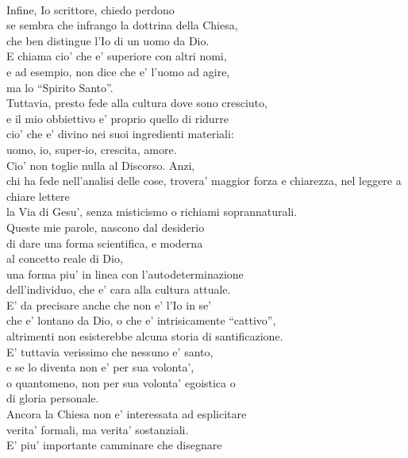 \begin{haiku}
    \leavevmode\\
    Infine, Io scrittore, chiedo perdono \\
    se sembra che infrango la dottrina della Chiesa,\\
    che ben distingue l'Io di un uomo da Dio. \\
    E chiama cio' che e' superiore con altri nomi, \\
    e ad esempio, non dice  che e' l'uomo ad agire,\\
    ma lo ``Spirito Santo''.\\
    Tuttavia, presto fede alla cultura dove sono cresciuto,\\
    e il mio obbiettivo e' proprio quello di ridurre \\
    cio' che e' divino nei suoi ingredienti materiali: \\
    uomo, io, super-io, crescita, amore. \\
    Cio' non toglie nulla al Discorso. Anzi,\\ 
    chi ha fede nell'analisi delle cose, trovera' 
    maggior forza e chiarezza, nel leggere a chiare lettere\\
    la Via di Gesu', senza misticismo o richiami soprannaturali.\\
    Queste mie parole, nascono dal desiderio \\
    di dare una forma scientifica, e moderna \\
    al concetto reale di Dio,\\
    una forma piu' in linea con l'autodeterminazione\\
    dell'individuo, che e' cara alla cultura attuale.\\
    E' da precisare anche che non e' l'Io in se'\\
    che e' lontano da Dio, o che e' intrisicamente ``cattivo'',\\
    altrimenti non esisterebbe alcuna storia di santificazione.\\
    E' tuttavia verissimo che nessuno e' santo,\\
    e se lo diventa non e' per sua volonta',\\
    o quantomeno, non per sua volonta' egoistica o \\
    di gloria personale.\\
    Ancora la Chiesa non e' interessata ad esplicitare\\
    verita' formali, ma verita' sostanziali.\\
    E' piu' importante camminare che disegnare \\

\end{haiku}
